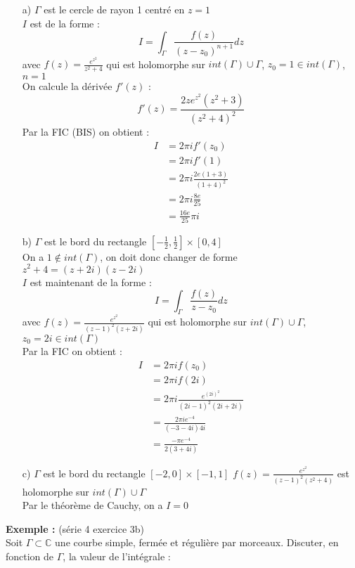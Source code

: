 \begin{itemize}
    \item[a)] $\Gamma$ est le cercle de rayon 1 centré en $z=1$ \\
    $I$ est de la forme :
    $$I = \int_{\Gamma} \frac{f(z)}{(z-z_0)^{n+1}}dz$$
    avec $f(z) = \frac{e^{z^2}}{z^2+4}$ qui est holomorphe sur $int(\Gamma) \cup \Gamma$, $z_0 = 1 \in int(\Gamma)$, $n=1$ \\
    On calcule la dérivée $f'(z)$ :
    $$f'(z) = \frac{2ze^{z^2}(z^2+3)}{(z^2+4)^2}$$
    Par la FIC (BIS) on obtient :
    \begin{align*}
        I &= 2\pi i f'(z_0) \\
        &= 2\pi i f'(1) \\
        &= 2\pi i \frac{2e(1+3)}{(1+4)^2} \\
        &= 2\pi i \frac{8e}{25} \\
        &= \frac{16e}{25}\pi i
    \end{align*}
    \item[b)] $\Gamma$ est le bord du rectangle $[-\frac{1}{2}, \frac{1}{2}] \times [0,4]$ \\
    On a $1 \notin int(\Gamma)$, on doit donc changer de forme \\
    $z^2+4 = (z+2i)(z-2i)$ \\
    $I$ est maintenant de la forme :
    $$I = \int_{\Gamma} \frac{f(z)}{z-z_0}dz$$
    avec $f(z) = \frac{e^{z^2}}{(z-1)^2(z+2i)}$ qui est holomorphe sur $int(\Gamma) \cup \Gamma$, $z_0 = 2i \in int(\Gamma)$ \\
    Par la FIC on obtient : 
    \begin{align*}
        I &= 2\pi i f(z_0) \\
        &= 2\pi i f(2i) \\
        &= 2\pi i \frac{e^{(2i)^2}}{(2i-1)^2(2i+2i)} \\
        &= \frac{2\pi i e^{-4}}{(-3-4i)4i} \\
        &= \frac{-\pi e^{-4}}{2(3+4i)}
    \end{align*}
    \item[c)] $\Gamma$ est le bord du rectangle $[-2,0] \times [-1,1]$
    $f(z) = \frac{e^{z^2}}{(z-1)^2(z^2+4)}$ est holomorphe sur $int(\Gamma) \cup \Gamma$ \\
    Par le théorème de Cauchy, on a $I = 0$
\end{itemize}
\textbf{Exemple :} (série 4 exercice 3b) \\
Soit $\Gamma \subset \mathbb{C}$ une courbe simple, fermée et régulière par morceaux. Discuter, en fonction de $\Gamma$, la valeur de l'intégrale :
